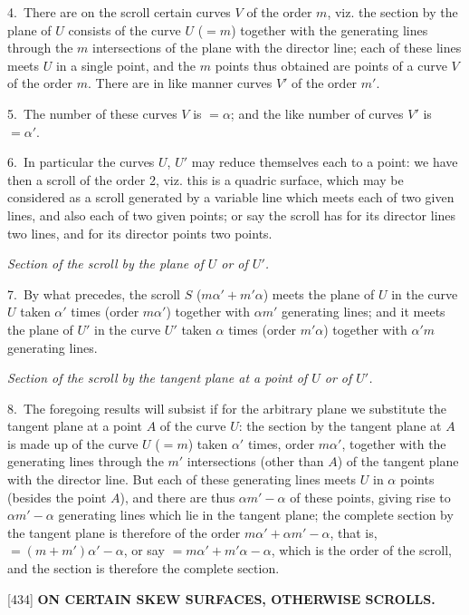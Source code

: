 \documentclass[12pt,a4paper]{article}
\newcommand{\paperref}[1]{\textup{[#1]}}
\theoremstyle{definition}
\begin{document}
4.~There are on the scroll certain curves $V$ of the order $m$, viz. the section by the plane of $U$ consists of the curve $U$ ($= m$) together with the generating lines through the $m$ intersections of the plane with the director line; each of these lines meets $U$ in a single point, and the $m$ points thus obtained are points of a curve $V$ of the order $m$. There are in like manner curves $V'$ of the order $m'$.

5.~The number of these curves $V$ is $= \alpha$; and the like number of curves $V'$ is $= \alpha'$.

6.~In particular the curves $U$, $U'$ may reduce themselves each to a point: we have then a scroll of the order 2, viz. this is a quadric surface, which may be considered as a scroll generated by a variable line which meets each of two given lines, and also each of two given points; or say the scroll has for its director lines two lines, and for its director points two points.

\textit{Section of the scroll by the plane of $U$ or of $U'$.}

7.~By what precedes, the scroll $S$ ($m\alpha' + m'\alpha$) meets the plane of $U$ in the curve $U$ taken $\alpha'$ times (order $m\alpha'$) together with $\alpha m'$ generating lines; and it meets the plane of $U'$ in the curve $U'$ taken $\alpha$ times (order $m'\alpha$) together with $\alpha' m$ generating lines.

\textit{Section of the scroll by the tangent plane at a point of $U$ or of $U'$.}

8.~The foregoing results will subsist if for the arbitrary plane we substitute the tangent plane at a point $A$ of the curve $U$: the section by the tangent plane at $A$ is made up of the curve $U$ ($= m$) taken $\alpha'$ times, order $m\alpha'$, together with the generating lines through the $m'$ intersections (other than $A$) of the tangent plane with the director line. But each of these generating lines meets $U$ in $\alpha$ points (besides the point $A$), and there are thus $\alpha m' - \alpha$ of these points, giving rise to $\alpha m' - \alpha$ generating lines which lie in the tangent plane; the complete section by the tangent plane is therefore of the order $m\alpha' + \alpha m' - \alpha$, that is, $= (m + m')\alpha' - \alpha$, or say $= m\alpha' + m'\alpha - \alpha$, which is the order of the scroll, and the section is therefore the complete section.

\newpage
\setcounter{page}{58}

\noindent\paperref{434}\quad
\textbf{ON CERTAIN SKEW SURFACES, OTHERWISE SCROLLS.}
\end{document}
